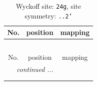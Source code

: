 \documentclass[fleqn,8pt]{jsarticle}
\begin{document}
\renewcommand{\arraystretch}{1.2}
\begin{longtable}{ccc}
\caption{Wyckoff site: {\tt 24g}, site symmetry: {\tt ..2'}}
 \\
 \hline \hline
No. & position & mapping \\ \hline \endfirsthead

\multicolumn{2}{l}{\tablename\ \thetable{}} \\
 \hline \hline
No. & position & mapping \\ \hline \endhead

 \hline \hline
\multicolumn{2}{r}{\footnotesize\it continued ...} \\ \endfoot

 \hline \hline
\multicolumn{2}{r}{} \\ \endlastfoot


\end{longtable}
\end{document}
